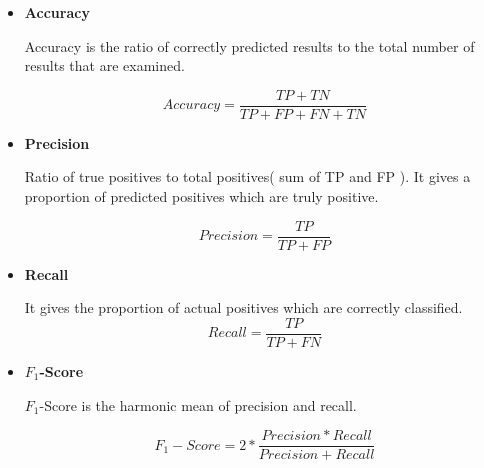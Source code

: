 \documentclass[12pt,letter-paper]{article}
\begin{document}
        \begin{itemize}
            \item\textbf{Accuracy}
            
                 Accuracy is the ratio of correctly predicted results to the total number of results that are examined.
             
            \begin{equation}
                Accuracy = \frac{TP + TN }{TP + FP + FN + TN}
                \label{eq:3}
            \end{equation} 
                
            
            \item\textbf{Precision}
            
                Ratio of true positives to total positives( sum of TP and FP ). It gives a proportion of predicted positives which are truly positive.
            
            \begin{equation}
                Precision = \frac{TP}{TP + FP}
                \label{eq:4}
            \end{equation} 
            
            \item\textbf{Recall}
            
                It gives the proportion of actual positives which are correctly classified.
            \begin{equation}
                Recall = \frac{TP}{TP + FN}
                \label{eq:5}
            \end{equation}
            
            \item\textbf{$F_1$-Score}
            
                $F_1$-Score is the harmonic mean of precision and recall.
            
            \begin{equation}
                F_1-Score = 2 * \frac{Precision * Recall}{Precision + Recall}
                \label{eq:6}
            \end{equation}
            
        \end{itemize}
        
\end{document}
